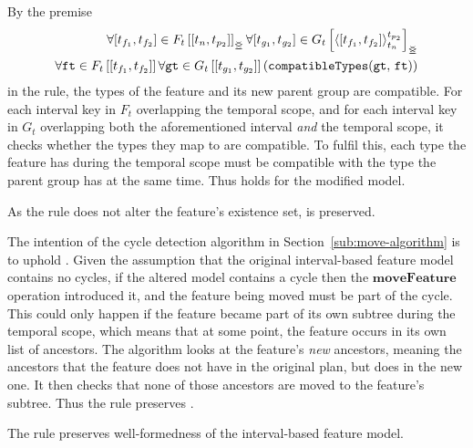 By the premise
\[
   \begin{split}
      \forall \interval{t_{f_1}}{t_{f_2}} \in \overlapping{F_t}{t_n}{t_{p_2}}
      \forall \interval{t_{g_1}}{t_{g_2}} \in \lookup{G_t}{\clamp{\interval{t_{f_1}}{t_{f_2}}}{t_n}{t_{p_2}}}_{\overlap{}} \\
         \forall \var{ft} \in \lookup{F_t}{\interval{t_{f_1}}{t_{f_2}}}
         \forall \var{gt} \in \lookup{G_t}{\interval{t_{g_1}}{t_{g_2}}}
         \left(\var{compatibleTypes}(\var{gt},\, \var{ft}) \right)
   \end{split}
\]
in the rule, the types of the feature and its new parent group are compatible. For each interval key in $F_t$ overlapping the temporal scope, and for each interval key in $G_t$ overlapping both the aforementioned interval \emph{and} the temporal scope, it checks whether the types they map to are compatible. To fulfil this, each type the feature has during the temporal scope must be compatible with the type the parent group has at the same time. Thus  holds for the modified model.

As the rule does not alter the feature's existence set,  is preserved. 

The intention of the cycle detection algorithm in Section~\vref{sub:move-algorithm} is to uphold . Given the assumption that the original interval-based feature model contains no cycles, if the altered model contains a cycle then the $\textbf{moveFeature}$ operation introduced it, and the feature being moved must be part of the cycle. This could only happen if the feature became part of its own subtree during the temporal scope, which means that at some point, the feature occurs in its own list of ancestors. The algorithm looks at the feature's \emph{new} ancestors, meaning the ancestors that the feature does not have in the original plan, but does in the new one. It then checks that none of those ancestors are moved to the feature's subtree. Thus the rule preserves .
\\

\begin{lemma}
   The  rule preserves well-formedness of the interval-based feature model. 
   \label{lemma:move-feature-well-formed}
\end{lemma}

